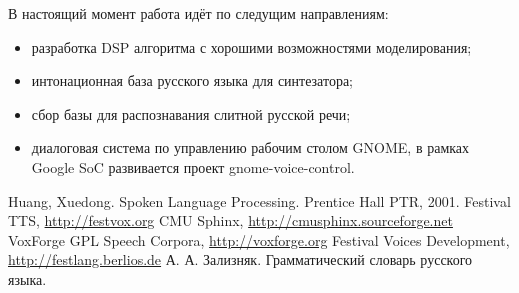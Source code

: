 В настоящий момент работа идёт по следущим направлениям:

\begin{itemize}
\item разработка DSP алгоритма с хорошими возможностями моделирования;
\item интонационная база русского языка для синтезатора;
\item сбор базы для распознавания слитной русской речи;
\item диалоговая система по управлению рабочим столом GNOME, в рамках Google SoC развивается проект gnome-voice-control.
\end{itemize}

\begin{thebibliography}{99}
 Huang, Xuedong. Spoken Language Processing. Prentice Hall PTR, 2001.
 Festival TTS, \url{http://festvox.org}
 CMU Sphinx, \url{http://cmusphinx.sourceforge.net}
 VoxForge GPL Speech Corpora, \url{http://voxforge.org}
 Festival Voices Development, \url{http://festlang.berlios.de}
 А. А. Зализняк. Грамматический словарь русского языка.
\end{thebibliography}

